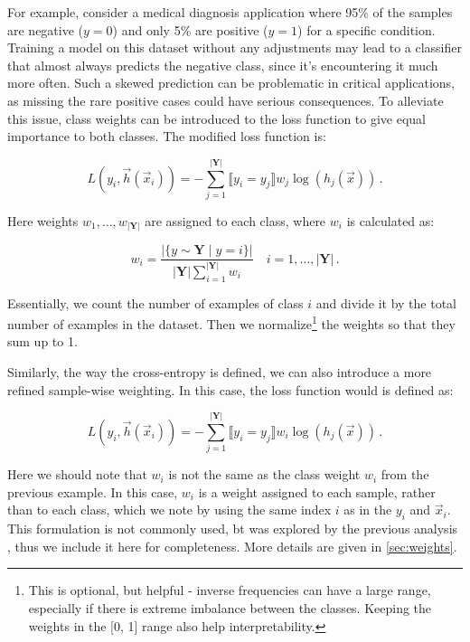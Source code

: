 For example, consider a medical diagnosis application where 95\% of the samples are negative ($y = 0$) and only 5\% are
positive ($y = 1$) for a specific condition. Training a model on this dataset without any adjustments may lead to a
classifier that almost always predicts the negative class, since it's encountering it much more often. Such a skewed
prediction can be problematic in critical applications, as missing the rare positive cases could have serious
consequences. To alleviate this issue, class weights can be introduced to the loss function to give equal importance to
both classes. The modified loss function is:

\begin{equation}
    \label{eq:weight-per-class}
    L(y_i, \vec{h}(\vec{x}_i)) = -\sum_{j = 1}^{|\textbf{Y}|} \llbracket y_i = y_j \rrbracket w_j \log(h_j(\vec{x}))\,.
\end{equation}

Here weights $w_1, \dots, w_{|\textbf{Y}|}$ are assigned to each class, where $w_i$ is calculated as:

\begin{equation}
    w_i = \frac{|\{y \sim \textbf{Y} \mid y = i\}|}{|\textbf{Y}| \sum_{i = 1}^{|\textbf{Y}|} w_i} \quad i = 1, \dots, |\textbf{Y}|\,.
\end{equation}

Essentially, we count the number of examples of class $i$ and divide it by the total number of examples in the dataset.
Then we normalize\footnote{This is optional, but helpful - inverse frequencies can have a large range, especially if
    there is extreme imbalance between the classes. Keeping the weights in the [0, 1] range also help interpretability.}
the weights so that they sum up to 1.


Similarly, the way the cross-entropy is defined, we can also introduce a more refined sample-wise weighting. In this
case, the loss function would is defined as:

\begin{equation}
    \label{eq:weight-per-sample}
    L(y_i, \vec{h}(\vec{x}_i)) = -\sum_{j = 1}^{|\textbf{Y}|} \llbracket y_i = y_j \rrbracket w_i \log(h_j(\vec{x}))\,.
\end{equation}

Here we should note that $w_i$ is not the same as the class weight $w_i$ from the previous example. In this case, $w_i$
is a weight assigned to each sample, rather than to each class, which we note by using the same index $i$ as in the
$y_i$ and $\vec{x}_i$. This formulation is not commonly used, bt was explored by the previous analysis
\cite{severin,jan}, thus we include it here for completeness. More details are given in \autoref{sec:weights}.

